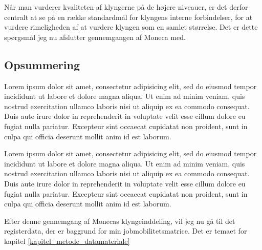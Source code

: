 Når man vurderer kvaliteten af klyngerne på de højere niveauer, er det derfor centralt at se på en række standardmål for klyngens interne forbindelser, for at vurdere rimeligheden af at vurdere klyngen som en samlet størrelse. Det er dette spørgsmål jeg nu afslutter gennemgangen af Moneca med.









\subsection{Opsummering \label{}}

Lorem ipsum dolor sit amet, consectetur adipisicing elit, sed do eiusmod
tempor incididunt ut labore et dolore magna aliqua. Ut enim ad minim veniam,
quis nostrud exercitation ullamco laboris nisi ut aliquip ex ea commodo
consequat. Duis aute irure dolor in reprehenderit in voluptate velit esse
cillum dolore eu fugiat nulla pariatur. Excepteur sint occaecat cupidatat non
proident, sunt in culpa qui officia deserunt mollit anim id est laborum.

Lorem ipsum dolor sit amet, consectetur adipisicing elit, sed do eiusmod
tempor incididunt ut labore et dolore magna aliqua. Ut enim ad minim veniam,
quis nostrud exercitation ullamco laboris nisi ut aliquip ex ea commodo
consequat. Duis aute irure dolor in reprehenderit in voluptate velit esse
cillum dolore eu fugiat nulla pariatur. Excepteur sint occaecat cupidatat non
proident, sunt in culpa qui officia deserunt mollit anim id est laborum.

Efter denne gennemgang af Monecas klyngeinddeling, vil jeg nu gå til det registerdata, der er baggrund for min jobmobilitetsmatrice. Det er temaet for kapitel \ref{kapitel_metode_datamateriale}



\iffalse \label{iffalse}




